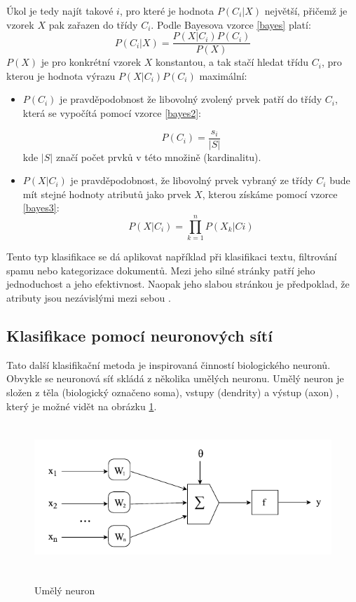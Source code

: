 Úkol je tedy najít takové $i$, pro které je hodnota $P(C_i|X)$ největší, přičemž je vzorek $X$ pak zařazen do třídy $C_i$. Podle Bayesova vzorce \ref{bayes} platí:
\begin{equation}
	 P(C_i|X) =\frac{P(X|C_i)P(C_i)}{P(X)}
	\label{bayes}
\end{equation}
$P(X)$ je pro konkrétní vzorek $X$ konstantou, a tak stačí hledat třídu $C_i$, pro kterou je hodnota výrazu $P(X|C_i)P(C_i)$ maximální:
\begin{itemize}
    \item $P(C_i)$ je pravděpodobnost že libovolný zvolený prvek patří do třídy $C_i$, která se vypočítá pomocí vzorce \ref{bayes2}:
    
    \begin{equation}
	    P(C_i) =\frac{s_i}{|S|}
	    \label{bayes2}
    \end{equation}
kde $|S|$ značí počet prvků v této množině (kardinalitu).
    \item $P(X|C_i)$ je pravděpodobnost, že libovolný prvek vybraný ze třídy $C_i$ bude mít stejné hodnoty atributů jako prvek $X$, kterou získáme pomocí vzorce \ref{bayes3}:
    \begin{equation}
	    P(X|C_i) = \prod_{k=1}^n P(X_k|Ci)
	    \label{bayes3}
    \end{equation}
\end{itemize}

Tento typ klasifikace se dá aplikovat například při klasifikaci textu, filtrování spamu nebo kategorizace dokumentů. Mezi jeho silné stránky patří jeho jednoduchost a jeho efektivnost. Naopak jeho slabou stránkou je předpoklad, že atributy jsou nezávislými mezi sebou \cite{Rish}.

\subsection*{Klasifikace pomocí neuronových sítí}
Tato další klasifikační metoda je inspirovaná činností biologického neuronů. Obvykle se neuronová síť skládá z několika umělých neuronu. Umělý neuron je složen z těla (biologický označeno soma), vstupy (dendrity) a výstup (axon) \cite{Kantardzic}, který je možné vidět na obrázku \ref{neuron}.

\begin{figure}[h]\centering
  \centering
  \includegraphics[width=\linewidth,height=2.2in]{obrazky/Umely-neuron.pdf}\\[1pt]
  \caption{Umělý neuron}
  \label{neuron}
\end{figure}

